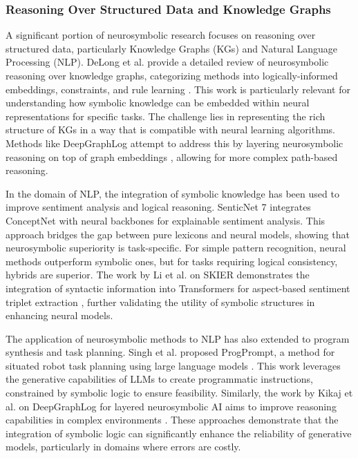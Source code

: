 \documentclass{article}
\begin{document}
\subsubsection{Reasoning Over Structured Data and Knowledge Graphs}

\label{sec:reasoning_over_structured_data_and_knowl}

A significant portion of neurosymbolic research focuses on reasoning over structured data, particularly Knowledge Graphs (KGs) and Natural Language Processing (NLP). DeLong et al. provide a detailed review of neurosymbolic reasoning over knowledge graphs, categorizing methods into logically-informed embeddings, constraints, and rule learning \cite{delong2023neurosymbolic}. This work is particularly relevant for understanding how symbolic knowledge can be embedded within neural representations for specific tasks. The challenge lies in representing the rich structure of KGs in a way that is compatible with neural learning algorithms. Methods like DeepGraphLog attempt to address this by layering neurosymbolic reasoning on top of graph embeddings \cite{kikaj2025deepgraphlog}, allowing for more complex path-based reasoning.

In the domain of NLP, the integration of symbolic knowledge has been used to improve sentiment analysis and logical reasoning. SenticNet 7 integrates ConceptNet with neural backbones for explainable sentiment analysis. This approach bridges the gap between pure lexicons and neural models, showing that neurosymbolic superiority is task-specific. For simple pattern recognition, neural methods outperform symbolic ones, but for tasks requiring logical consistency, hybrids are superior. The work by Li et al. on SKIER demonstrates the integration of syntactic information into Transformers for aspect-based sentiment triplet extraction \cite{li2023skier}, further validating the utility of symbolic structures in enhancing neural models.

The application of neurosymbolic methods to NLP has also extended to program synthesis and task planning. Singh et al. proposed ProgPrompt, a method for situated robot task planning using large language models \cite{singh2023progprompt}. This work leverages the generative capabilities of LLMs to create programmatic instructions, constrained by symbolic logic to ensure feasibility. Similarly, the work by Kikaj et al. on DeepGraphLog for layered neurosymbolic AI aims to improve reasoning capabilities in complex environments \cite{kikaj2025deepgraphlog}. These approaches demonstrate that the integration of symbolic logic can significantly enhance the reliability of generative models, particularly in domains where errors are costly.
\end{document}
